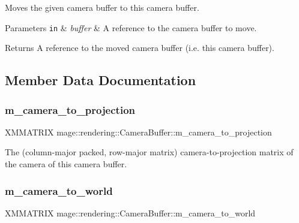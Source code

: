 Moves the given camera buffer to this camera buffer.


\begin{DoxyParams}[1]{Parameters}
\mbox{\tt in}  & {\em buffer} & A reference to the camera buffer to move. \\
\hline
\end{DoxyParams}
\begin{DoxyReturn}{Returns}
A reference to the moved camera buffer (i.\+e. this camera buffer). 
\end{DoxyReturn}


\subsection{Member Data Documentation}
\mbox{\label{structmage_1_1rendering_1_1_camera_buffer_a75669aa0916514b1d414e5a2f7c72c75}} 
\subsubsection{\texorpdfstring{m\+\_\+camera\+\_\+to\+\_\+projection}{m\_camera\_to\_projection}}
{\footnotesize\ttfamily X\+M\+M\+A\+T\+R\+IX mage\+::rendering\+::\+Camera\+Buffer\+::m\+\_\+camera\+\_\+to\+\_\+projection}

The (column-\/major packed, row-\/major matrix) camera-\/to-\/projection matrix of the camera of this camera buffer. \mbox{\label{structmage_1_1rendering_1_1_camera_buffer_a0633cfc689f2a097783ecc1626b94590}} 
\subsubsection{\texorpdfstring{m\+\_\+camera\+\_\+to\+\_\+world}{m\_camera\_to\_world}}
{\footnotesize\ttfamily X\+M\+M\+A\+T\+R\+IX mage\+::rendering\+::\+Camera\+Buffer\+::m\+\_\+camera\+\_\+to\+\_\+world}

